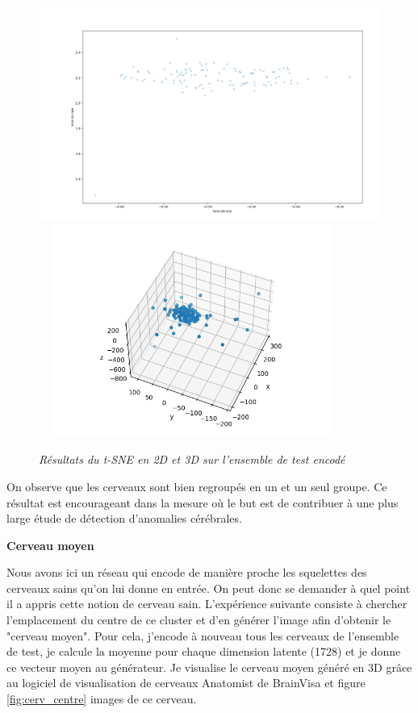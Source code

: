 \documentclass[12pt, oneside, a4paper, titlepage]{article}
\begin{document}
\begin{figure}[H]
    \centering
\includegraphics[width=13cm, height=7cm]{tsne.png}
\includegraphics[width=10cm, height=7cm]{tsne3Dtest.png}
    \caption{\textit{Résultats du t-SNE en 2D et 3D sur l'ensemble de test encodé}}
    \label{fig:tsne}
\end{figure}

On observe que les cerveaux sont bien regroupés en un et un seul groupe. Ce résultat est encourageant dans la mesure où le but est de contribuer à une plus large étude de détection d'anomalies cérébrales. 

\vspace{1mm}

\textbf{Cerveau moyen}

\vspace{1mm}

Nous avons ici un réseau qui encode de manière proche les squelettes des cerveaux sains qu'on lui donne en entrée. On peut donc se demander à quel point il a appris cette notion de cerveau sain. L'expérience suivante consiste à chercher l'emplacement du centre de ce cluster et d'en générer l'image afin d'obtenir le "cerveau moyen". Pour cela, j'encode à nouveau tous les cerveaux de l'ensemble de test, je calcule la moyenne pour chaque dimension latente (1728) et je donne ce vecteur moyen au générateur. Je visualise le cerveau moyen généré en 3D grâce au logiciel de visualisation de cerveaux Anatomist de BrainVisa et figure \ref{fig:cerv_centre} images de ce cerveau.
\end{document}
